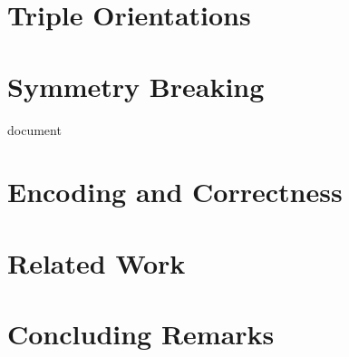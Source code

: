 \documentclass[a4paper, USenglish, cleveref, autoref, thm-restate]{lipics-v2021}
\begin{document}
\section{Triple Orientations}\label{sec:triple-orientations}


% 

\section{Symmetry Breaking}\label{sec:symmetry-breaking}

document
\section{Encoding and Correctness}\label{sec:encoding}


% 

\section{Related Work}\label{sec:related-work}


\section{Concluding Remarks}\label{sec:conclusions}



\end{document}
